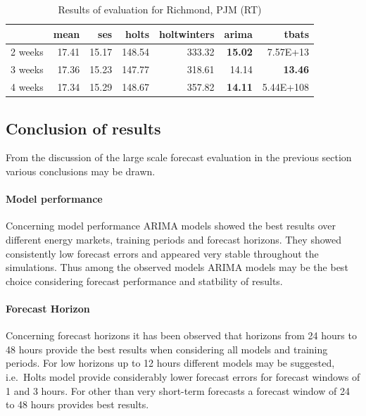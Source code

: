 \begin{table}[ht]
\centering
\begin{tabular}{rrrrrrr}
  \hline
 & mean & ses & holts & holtwinters & arima & tbats \\ 
  \hline
2 weeks & 17.41 & 15.17 & 148.54 & 333.32 & \textbf{15.02} & 7.57E+13 \\ 
  3 weeks & 17.36 & 15.23 & 147.77 & 318.61 & 14.14 & \textbf{ 13.46} \\ 
  4 weeks & 17.34 & 15.29 & 148.67 & 357.82 & \textbf{14.11} & 5.44E+108 \\  
   \hline
\end{tabular}
\caption{Results of evaluation for Richmond, PJM (RT)}
\label{tab:aggregated_results_pjm}
\end{table}



\subsection{Conclusion of results}

From the discussion of the large scale forecast evaluation in the previous section various conclusions may be drawn. 

\paragraph{Model performance}

Concerning model performance ARIMA models showed the best results over different energy markets, training periods and forecast horizons. 
They showed consistently low forecast errors and appeared very stable throughout the simulations. Thus among the observed models ARIMA models may be the best choice considering forecast performance and statbility of results. 

\paragraph{Forecast Horizon}

Concerning forecast horizons it has been observed that horizons from 24 hours to 48 hours provide the best results when considering all models and training periods. 
For low horizons up to 12 hours different models may be suggested, i.e.~Holts model provide considerably lower forecast errors for forecast windows of 1 and 3 hours. 
For other than very short-term forecasts a forecast window of 24 to 48 hours provides best results. 

